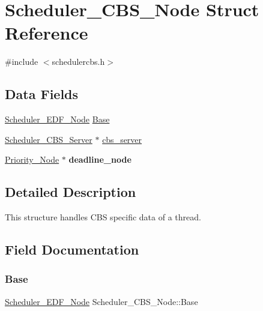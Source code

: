 \hypertarget{structScheduler__CBS__Node}{}\section{Scheduler\+\_\+\+C\+B\+S\+\_\+\+Node Struct Reference}
\label{structScheduler__CBS__Node}


{\ttfamily \#include $<$schedulercbs.\+h$>$}

\subsection*{Data Fields}
\begin{DoxyCompactItemize}
\item 
\mbox{\hyperlink{structScheduler__EDF__Node}{Scheduler\+\_\+\+E\+D\+F\+\_\+\+Node}} \mbox{\hyperlink{structScheduler__CBS__Node_af12352e30b648b8054a76175e2bc32c8}{Base}}
\item 
\mbox{\hyperlink{structScheduler__CBS__Server}{Scheduler\+\_\+\+C\+B\+S\+\_\+\+Server}} $\ast$ \mbox{\hyperlink{structScheduler__CBS__Node_adbcbec63492eb9cd70921b1be70e4ea6}{cbs\+\_\+server}}
\item 
\mbox{\label{structScheduler__CBS__Node_aa4621c30bb77af549f7a3085f000f743}} 
\mbox{\hyperlink{structPriority__Node}{Priority\+\_\+\+Node}} $\ast$ {\bfseries deadline\+\_\+node}
\end{DoxyCompactItemize}


\subsection{Detailed Description}
This structure handles C\+BS specific data of a thread. 

\subsection{Field Documentation}
\mbox{\label{structScheduler__CBS__Node_af12352e30b648b8054a76175e2bc32c8}} 
\subsubsection{\texorpdfstring{Base}{Base}}
{\footnotesize\ttfamily \mbox{\hyperlink{structScheduler__EDF__Node}{Scheduler\+\_\+\+E\+D\+F\+\_\+\+Node}} Scheduler\+\_\+\+C\+B\+S\+\_\+\+Node\+::\+Base}

